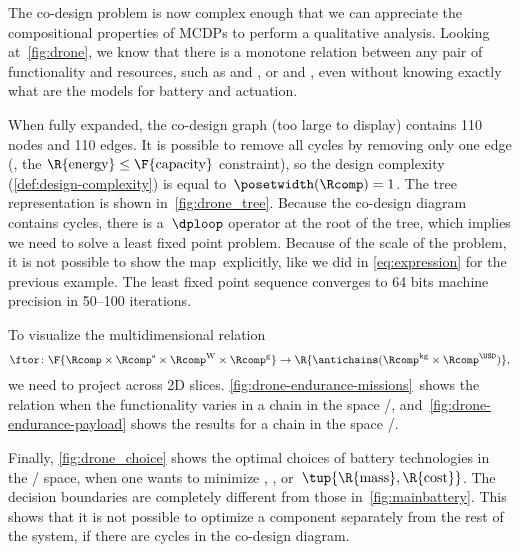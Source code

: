 The co-design problem is now complex enough that we can appreciate
the compositional properties of MCDPs to perform a qualitative analysis.
Looking at~\cref{fig:drone}, we know that there is a monotone relation
between any pair of functionality and resources, such as 
and , or  and , even without knowing
exactly what are the models for battery and actuation.

When fully expanded, the co-design graph (too large to display) contains
110 nodes and 110 edges. It is possible to remove all cycles by removing
only one edge (\eg , the $\R{\text{energy}}\leq\text{\F{\text{capacity}}}$
constraint), so the design complexity (\cref{def:design-complexity})
is equal to~$\posetwidth(\Rcomp)=1$. The
tree representation is shown in~\cref{fig:drone_tree}. Because the
co-design diagram contains cycles, there is a~$\dploop$ operator
at the root of the tree, which implies we need to solve a least fixed
point problem. Because of the scale of the problem, it is not possible
to show the map~\ftor explicitly, like we did in \cref{eq:expression}
for the previous example. The least fixed point sequence converges
to 64 bits machine precision in 50--100 iterations.

To visualize the multidimensional relation
\begin{equation*}
  \ftor\colon\F{\Rcomp\times\Rcomp^{\text{s}}\times\Rcomp^{\text{W}}\times\Rcomp^{\text{g}}}\rightarrow\R{\antichains(\Rcomp^{\text{kg}}\times\Rcomp^{\USD})},
\end{equation*}
we need to project across 2D slices. \cref{fig:drone-endurance-missions}~shows
the relation when the functionality varies in a chain in the space
/, and~\cref{fig:drone-endurance-payload}
shows the results for a chain in the space /.

Finally, \cref{fig:drone_choice} shows the optimal choices of battery
technologies in the / space, when one
wants to minimize , , or~$\tup{ \R{\text{mass}},\R{\text{cost}}} $.
The decision boundaries are completely different from those in~\cref{fig:mainbattery}.
This shows that it is not possible to optimize a component separately
from the rest of the system, if there are cycles in the co-design
diagram.

